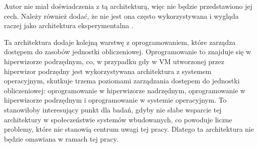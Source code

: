 \documentclass[../../main]{subfiles}
\begin{document}
Autor nie miał doświadczenia z tą architekturą, więc nie będzie przedstawiono jej cech. Należy również dodać, że nie jest ona często wykorzystywana i wygląda raczej jako architektura eksperymentalna \cite{nestvirtarm}.

Ta architektura dodaje kolejną warstwę z oprogramowaniem, które zarządza dostępem do zasobów jednostki obliczeniowej. Oprogramowanie to znajduje się w hiperwizorze podrzędnym, co, w przypadku gdy w VM utworzonej przez hiperwizor podrzędny jest wykorzystywana architektura z systemem operacyjnym, skutkuje trzema poziomami zarządzania dostępem do jednostki obliczeniowej: oprogramowanie w hiperwizorze nadrzędnym, oprogramowanie w hiperwizorze podrzędnym i oprogramowanie w systemie operacyjnym. To stanowiłoby interesujący punkt dla badań, gdyby nie słabe wsparcie tej architektury w społeczeństwie systemów wbudowanych, co powoduje liczne problemy, które nie stanowią centrum uwagi tej pracy. Dlatego ta architektura nie będzie omawiana w ramach tej pracy.
\end{document}
